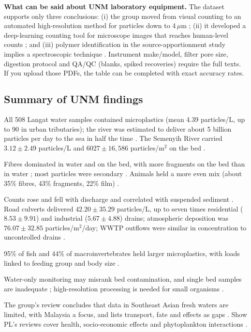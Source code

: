 \documentclass[11pt,a4paper]{article}
\newcommand{\um}{\,\ensuremath{\mu}m}
\begin{document}
\noindent\textbf{What can be said about UNM laboratory equipment.} The dataset supports only three conclusions: (i) the group moved from visual counting to an automated high-resolution method for particles down to 4\um{} \cite{ng24}; (ii) it developed a deep-learning counting tool for microscope images that reaches human-level counts \cite{lee22}; and (iii) polymer identification in the source-apportionment study implies a spectroscopic technique \cite{chen22}. Instrument make/model, filter pore size, digestion protocol and QA/QC (blanks, spiked recoveries) require the full texts. If you upload those PDFs, the table can be completed with exact accuracy rates.

\subsection{Summary of UNM findings}
\begin{description}[leftmargin=0pt,labelindent=0pt,style=unboxed]
\item[Abundance.] All 508 Langat water samples contained microplastics (mean 4.39 particles/L, up to 90 in urban tributaries); the river was estimated to deliver about 5 billion particles per day to the sea in half the time \cite{chen21a}. The Semenyih River carried $3.12\pm2.49$ particles/L and $6027\pm16{,}586$ particles/m$^2$ on the bed \cite{chen23}.
\item[Type and origin.] Fibres dominated in water and on the bed, with more fragments on the bed than in water \cite{chen23}; most particles were secondary \cite{chen21a}. Animals held a more even mix (about 35\% fibres, 43\% fragments, 22\% film) \cite{ng24}.
\item[Drivers.] Counts rose and fell with discharge and correlated with suspended sediment \cite{chen21a}. Road culverts delivered $42.20\pm35.29$ particles/L, up to seven times residential ($8.53\pm9.91$) and industrial ($5.67\pm4.88$) drains; atmospheric deposition was $76.07\pm32.85$ particles/m$^2$/day; WWTP outflows were similar in concentration to uncontrolled drains \cite{chen22}.
\item[Biota.] 95\% of fish and 44\% of macroinvertebrates held larger microplastics, with loads linked to feeding group and body size \cite{ng24}.
\item[Monitoring advice.] Water-only monitoring may misrank bed contamination, and single bed samples are inadequate \cite{chen23}; high-resolution processing is needed for small organisms \cite{ng24}.
\item[Regional context.] The group's review concludes that data in Southeast Asian fresh waters are limited, with Malaysia a focus, and lists transport, fate and effects as gaps \cite{chen21b}. Show PL's reviews cover health, socio-economic effects and phytoplankton interactions \cite{mofijur21,alowaisy26}.
\end{description}
\end{document}
